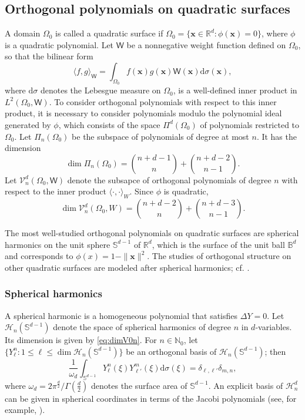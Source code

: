 \documentclass{amsart}
\theoremstyle{remark}
\def\la{{\langle}}
\def\ra{{\rangle}}
\def\d{\mathrm{d}}
\def\sph{{\mathbb{S}^{d-1}}}
\def\sW{{\mathsf W}}
\def\o{{\omega}}
\def\s{\sigma}
\def\la{{\langle}}
\def\ra{{\rangle}}
\def\xb{{\bm x}}
\def\CH{{\mathcal H}}
\def\CV{{\mathcal V}}
\def\BB{{\mathbb B}}
\def\NN{{\mathbb N}}
\def\RR{{\mathbb R}}
\def\f{\frac}
\begin{document}
\subsection{Orthogonal polynomials on quadratic surfaces}

A domain $\Omega_0$ is called a quadratic surface if $\Omega_0 = \{\xb \in \RR^d: \phi(\xb) = 0\}$, 
where $\phi$ is a quadratic polynomial. Let $\sW$ be a nonnegative weight function defined on 
$\Omega_0$, so that the bilinear form
$$
  \la f,g \ra_\sW = \int_{\Omega_0} f(\xb) g(\xb) \sW(\xb) \d \sigma(\xb),
$$
where $\d \s$ denotes the Lebesgue measure on $\Omega_0$, is a well-defined inner product 
in $L^2(\Omega_0, \sW)$. To consider orthogonal polynomials with respect to this inner product,
it is necessary to consider polynomials modulo the polynomial ideal generated by $\phi$, which 
consists of the space $\Pi^d(\Omega_0)$ of polynomials restricted to $\Omega_0$. 
Let $\Pi_n(\Omega_0)$ be the subspace of polynomials of degree at most $n$. It has the dimension 
$$
   \dim \Pi_n\left(\Omega_0 \right) = \binom{n + d -1}{n} + \binom{n + d -2}{n-1}. 
$$
Let $\CV_n^d(\Omega_0, \sW)$ denote the subsapce of orthogonal polynomials of degree $n$ 
with respect to the inner product $\la \cdot, \cdot\ra_W$. Since $\phi$ is quadratic, 
\begin{equation}\label{eq:dimV0n}
    \dim \CV_n^d(\Omega_0,W) =  \binom{n+d-2}{n}+ \binom{n+d-3}{n-1}. 
\end{equation}

The most well-studied orthogonal polynomials on quadratic surfaces are spherical harmonics
on the unit sphere $\sph$ of $\RR^d$, which is the surface of the unit ball $\BB^d$ and corresponds 
to $\phi(x) = 1-\|\xb\|^2$. The studies of orthogonal structure on other quadratic surfaces are modeled
after spherical harmonics; cf. \cite{OX, X20, X21}. 

\subsubsection{Spherical harmonics} 

A spherical harmonic is a homogeneous polynomial that satisfies $\Delta Y =0$. Let $\CH_n(\sph)$ 
denote the space of spherical harmonics of degree $n$ in $d$-variables. Its dimension is given 
by \eqref{eq:dimV0n}. For $n \in \NN_0$, let $\{Y_\ell^n: 1 \le \ell \le \dim \CH_n(\sph)\}$ be an 
orthogonal basis of $\CH_n(\sph)$; then 
$$
   \frac{1}{\o_d} \int_\sph Y_\ell^n (\xi) Y_{\ell'}^m (\xi)\d\s(\xi) = \delta_{\ell,\ell'} \delta_{m,n},
$$
where $\o_d = {2 \pi^{\f{d}{2}}}/{\Gamma(\f{d}{2})}$ denotes the surface area of $\sph$. 
An explicit basis of $\CH_n^d$ can be given in spherical coordinates in terms of the 
Jacobi polynomials (see, for example, \cite[p. 116]{DX}). 
\end{document}
